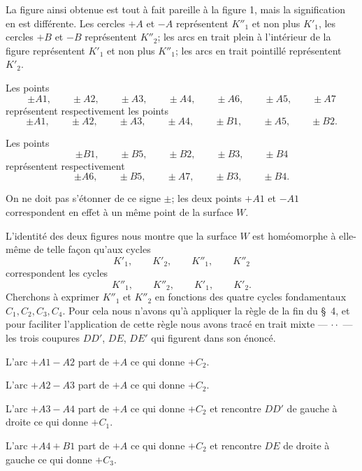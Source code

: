 \documentclass{article}
\begin{document}

La figure ainsi obtenue est tout à fait pareille à la figure 1, mais la signification en est différente. Les cercles $+A$ et $-A$ représentent $K''_{1}$ et non plus $K'_{1}$, les cercles $+B$ et $-B$ représentent $K''_{2}$; les arcs en trait plein à l'intérieur de la figure représentent $K'_{1}$ et non plus $K''_{1}$; les arcs en trait pointillé représentent $K'_{2}$.

Les points
\[ \pm A1, \qquad \pm A2, \qquad \pm A3, \qquad \pm A4, \qquad \pm A6, \qquad \pm A5, \qquad \pm A7 \]
représentent respectivement les points
\[ \pm A1, \qquad \pm A2, \qquad \pm A3, \qquad \pm A4, \qquad \pm B1, \qquad \pm A5, \qquad \pm B2. \]

Les points
\[ \pm B1, \qquad \pm B5, \qquad \pm B2, \qquad \pm B3, \qquad \pm B4 \]
représentent respectivement
\[ \pm A6, \qquad \pm B5, \qquad \pm A7, \qquad \pm B3, \qquad \pm B4. \]

On ne doit pas s'étonner de ce signe $\pm$; les deux points $+A1$ et $-A1$ correspondent en effet à un même point de la surface $W$.

L'identité des deux figures nous montre que la surface $W$ est homéomorphe à elle-même de telle façon qu'aux cycles
\[ K'_{1}, \qquad K'_{2}, \qquad K''_{1}, \qquad K''_{2} \]
correspondent les cycles
\[ K''_{1}, \qquad K''_{2}, \qquad K'_{1}, \qquad K'_{2}. \]
Cherchons à exprimer $K''_{1}$ et $K''_{2}$ en fonctions des quatre cycles fondamentaux $C_{1}, C_{2}, C_{3}, C_{4}$. Pour cela nous n'avons qu'à appliquer la règle de la fin du \S~4, et pour faciliter l'application de cette règle nous avons tracé en trait mixte --- $\cdot\cdot$ --- les trois coupures $DD'$, $DE$, $DE'$ qui figurent dans son énoncé.

L'arc $+A1 - A2$ part de $+A$ ce qui donne $+C_{2}$.

L'arc $+A2 - A3$ part de $+A$ ce qui donne $+C_{2}$.

L'arc $+A3 - A4$ part de $+A$ ce qui donne $+C_{2}$ et rencontre $DD'$ de gauche à droite ce qui donne $+C_{1}$.

L'arc $+A4 + B1$ part de $+A$ ce qui donne $+C_{2}$ et rencontre $DE$ de droite à gauche ce qui donne $+C_{3}$.
\end{document}
